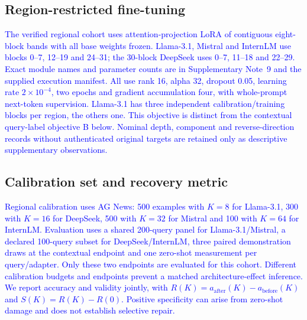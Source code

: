 \documentclass[pdflatex, sn-nature]{sn-jnl}%
\theoremstyle{thmstyleone}%
\theoremstyle{thmstyletwo}%
\theoremstyle{thmstylethree}%
\begin{document}
\subsection{Region-restricted fine-tuning}
\textcolor{blue}{The verified regional cohort uses attention-projection LoRA of contiguous eight-block bands with all base weights frozen. Llama-3.1, Mistral and InternLM use blocks 0--7, 12--19 and 24--31; the 30-block DeepSeek uses 0--7, 11--18 and 22--29. Exact module names and parameter counts are in Supplementary Note~9 and the supplied execution manifest. All use rank 16, alpha 32, dropout 0.05, learning rate $2\times10^{-4}$, two epochs and gradient accumulation four, with whole-prompt next-token supervision. Llama-3.1 has three independent calibration/training blocks per region, the others one. This objective is distinct from the contextual query-label objective B below. Nominal depth, component and reverse-direction records without authenticated original targets are retained only as descriptive supplementary observations.}


\subsection{Calibration set and recovery metric}
\textcolor{blue}{Regional calibration uses AG News: 500 examples with $K{=}8$ for Llama-3.1, 300 with $K{=}16$ for DeepSeek, 500 with $K{=}32$ for Mistral and 100 with $K{=}64$ for InternLM. Evaluation uses a shared 200-query panel for Llama-3.1/Mistral, a declared 100-query subset for DeepSeek/InternLM, three paired demonstration draws at the contextual endpoint and one zero-shot measurement per query/adapter. Only these two endpoints are evaluated for this cohort. Different calibration budgets and endpoints prevent a matched architecture-effect inference. We report accuracy and validity jointly, with $R(K)=a_{\mathrm{after}}(K)-a_{\mathrm{before}}(K)$ and $S(K)=R(K)-R(0)$. Positive specificity can arise from zero-shot damage and does not establish selective repair.}


\end{document}
